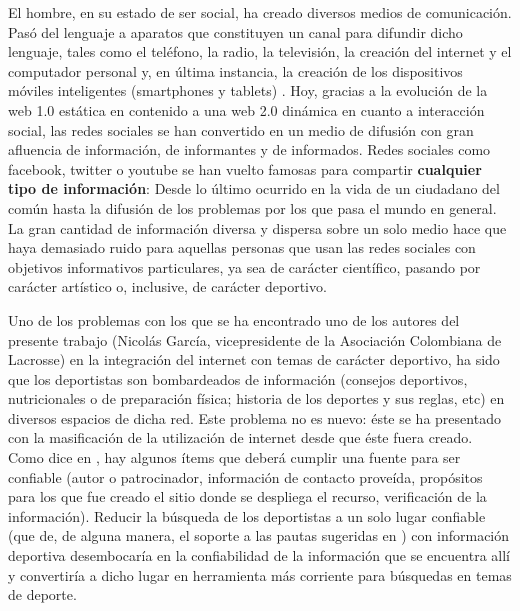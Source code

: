 
El hombre, en su estado de ser social, ha creado diversos medios de comunicación. Pasó del lenguaje a aparatos que constituyen un canal para difundir dicho lenguaje, tales como el teléfono, la radio, la televisión, la creación del internet y el computador personal y, en última instancia, la creación de los dispositivos móviles inteligentes (smartphones y tablets) . Hoy, gracias a la evolución de la web 1.0 estática en contenido a una web 2.0 dinámica en cuanto a interacción social, las redes sociales se han convertido en un medio de difusión con gran afluencia de información, de informantes y de informados. Redes sociales como facebook, twitter o youtube se han vuelto famosas para compartir \textbf{cualquier tipo de información}: Desde lo último ocurrido en la vida de un ciudadano del común hasta la difusión de los problemas por los que pasa el mundo en general. La gran cantidad de información diversa y dispersa sobre un solo medio hace que haya demasiado ruido para aquellas personas que usan las redes sociales con objetivos informativos particulares, ya sea de carácter científico, pasando por carácter artístico o, inclusive, de carácter deportivo.

Uno de los problemas con los que se ha encontrado uno de los autores del presente trabajo (Nicolás García, vicepresidente de la Asociación Colombiana de Lacrosse) en la integración del internet con temas de carácter deportivo, ha sido que los deportistas son bombardeados de información (consejos deportivos, nutricionales o de preparación física; historia de los deportes y sus reglas, etc) en diversos espacios de dicha red. Este problema no es nuevo: éste se ha presentado con la masificación de la utilización de internet desde que éste fuera creado. Como dice en \cite{judging}, hay algunos ítems que deberá cumplir una fuente para ser confiable (autor o patrocinador, información de contacto proveída, propósitos para los que fue creado el sitio donde se despliega el recurso, verificación de la información). Reducir la búsqueda de los deportistas a un solo lugar confiable (que de, de alguna manera, el soporte a las pautas sugeridas en \cite{judging}) con información deportiva desembocaría en la confiabilidad de la información que se encuentra allí y convertiría a dicho lugar en herramienta más corriente para búsquedas en temas de deporte.

